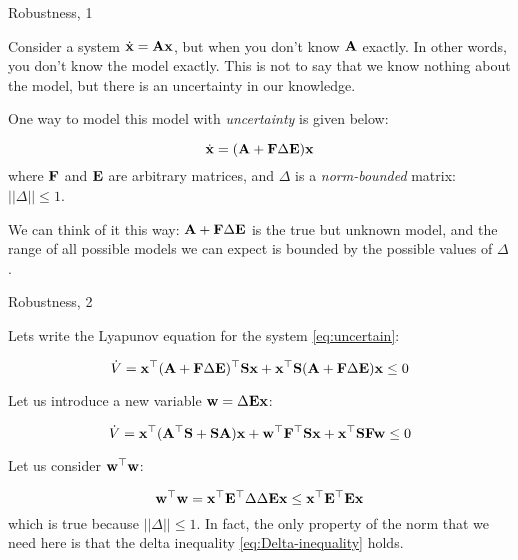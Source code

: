 \documentclass{beamer}
\begin{document}
\begin{frame}{Robustness, 1}
	\begin{flushleft}
		
		Consider a system $\dot{\mathbf{x}} = \mathbf{A}\mathbf{x}$, but when you don't know $\mathbf{A}$ exactly. In other words, you don't know the model exactly. This is not to say that we know nothing about the model, but there is an uncertainty in our knowledge.
		
		\bigskip
		
		One way to model this model with \emph{uncertainty} is given below:
		
		\begin{equation}
			\label{eq:uncertain}
			\dot{\mathbf{x}} = (\mathbf{A} + \mathbf{F} \Delta \mathbf{E})\mathbf{x}
		\end{equation}
		where $\mathbf{F}$ and $\mathbf{E}$ are arbitrary matrices, and $\Delta$ is a \emph{norm-bounded} matrix: $||\Delta|| \leq 1$.
		
		\bigskip
		
		We can think of it this way: $\mathbf{A} + \mathbf{F} \Delta \mathbf{E}$ is the true but unknown model, and the range of all possible models we can expect is bounded by the possible values of $\Delta$.
		
	\end{flushleft}
\end{frame}



\begin{frame}{Robustness, 2}
	\begin{flushleft}
		
		Lets write the Lyapunov equation for the system \eqref{eq:uncertain}:
		
		\begin{equation}
			\dot V = \mathbf{x}^\top 
			(\mathbf{A} + \mathbf{F} \Delta \mathbf{E})^\top\mathbf{S}\mathbf{x} + \mathbf{x}^\top\mathbf{S} (\mathbf{A} + \mathbf{F} \Delta \mathbf{E}) \mathbf{x} \leq 0
		\end{equation}
		
		Let us introduce a new variable $\mathbf{w} = \Delta \mathbf{E}\mathbf{x}$:
		
		\begin{equation}
			\label{eq:Lyapunov_xw}
			\dot V = \mathbf{x}^\top 
			(\mathbf{A}^\top \mathbf{S} + \mathbf{S}\mathbf{A}) \mathbf{x} + 
			\mathbf{w}^\top \mathbf{F}^\top\mathbf{S} \mathbf{x} +
			\mathbf{x}^\top \mathbf{S}\mathbf{F} \mathbf{w} \leq 0
		\end{equation}
		
		Let us consider $\mathbf{w}^\top \mathbf{w}$:
		
		\begin{equation}
			\label{eq:Delta-inequality}
			\mathbf{w}^\top \mathbf{w} = 
			\mathbf{x}^\top\mathbf{E}^\top \Delta \Delta \mathbf{E}\mathbf{x}
			\leq
			\mathbf{x}^\top\mathbf{E}^\top \mathbf{E}\mathbf{x}
		\end{equation}		
		which is true because $|| \Delta ||\leq 1$. In fact, the only property of the norm that we need here is that the delta inequality \eqref{eq:Delta-inequality} holds.
		
	\end{flushleft}
\end{frame}
\end{document}
